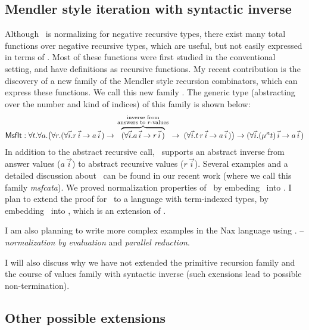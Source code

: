 \subsection{Mendler style iteration with syntactic inverse}
Although \MIt\ is normalizing for negative recursive types, there exist
many total functions over negative recursive types, which are
useful, but not easily expressed in terms of \MIt. Most of these functions
were first studied in the conventional setting, and have definitions as
recursive functions. My recent contribution is
the discovery of a new family of the Mendler style recursion combinators,
which can express these functions. We call this new family \MsfIt.
The generic type (abstracting over the number and kind of indices) 
of this family is shown below:
\label{sec:mendler:sf}
\[
 \textsf{MsfIt} : \forall t . \forall a .
   \big( \forall r.
            (\forall\vec{i} . r\,\vec{i} -> a\,\vec{i}\,)
   -> \overset{\begin{smallmatrix}
                        \text{inverse from} \\
                        \text{answers to $r$-values} \\
                       \end{smallmatrix}}{\overbrace{
            (\forall\vec{i} . a\,\vec{i} -> r\,\vec{i}\,) }}
   -> \;    (\forall\vec{i} . t \, r\,\vec{i} -> a\,\vec{i}\,)
   \big)
 -> (\forall\vec{i} . (\mu^\kappa t)\,\vec{i} -> a\,\vec{i}\,)
\]
In addition to the abstract recursive call, \MsfIt\ supports an abstract
inverse from answer values ($a \,\vec{i}$) to abstract recursive values ($r\,\vec{i}$).
Several examples and a detailed discussion about \MsfIt\ can be found in
our recent work \cite{AhnShe11} (where we call this family \textit{msfcata}).
We \cite{AhnShe11} proved normalization properties of \MsfIt\ by
embeding \MsfIt\ into \Fw. I plan to extend the proof for \MsfIt\,
to a language with term-indexed types, by embedding \MsfIt\
into \Fi, which is an extension of \Fw.

I am also planning to write more complex examples in the Nax language using \MIt.
-- \emph{normalization by evaluation} and \emph{parallel reduction}.

I will also discuss why we have not extended the primitive recursion family
and the course of values family with syntactic inverse (such exensions lead to possible non-termination).

\subsection{Other possible extensions}\label{sec:mendler:etc}

